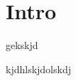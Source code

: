 \documentclass[a4paper,10pt]{article}
\title{}
\author{}
\begin{document}
\maketitle

\begin{abstract}

\end{abstract}

\section{Intro}
gekskjd



kjdhlskjdolskdj
\end{document}
